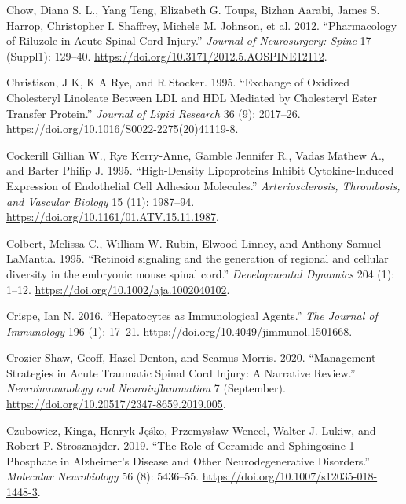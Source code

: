 \documentclass[9pt,lineno]{elife}
\newlength{\cslhangindent}
\newlength{\cslentryspacingunit} %
\newenvironment{CSLReferences}[2] %
 {%
  \setlength{\parindent}{0pt}
  \ifodd #1
  \let\oldpar\par
  \def\par{\hangindent=\cslhangindent\oldpar}
  \fi
  \setlength{\parskip}{#2\cslentryspacingunit}
 }%
 {}
\begin{document}
\begin{landscape}
\begin{landscape}
\begin{landscape}
\begin{landscape}
\begin{CSLReferences}{1}{0}
\leavevmode{}%
Chow, Diana S. L., Yang Teng, Elizabeth G. Toups, Bizhan Aarabi, James S. Harrop, Christopher I. Shaffrey, Michele M. Johnson, et al. 2012. {``Pharmacology of Riluzole in Acute Spinal Cord Injury.''} \emph{Journal of Neurosurgery: Spine} 17 (Suppl1): 129--40. \url{https://doi.org/10.3171/2012.5.AOSPINE12112}.

\leavevmode{}%
Christison, J K, K A Rye, and R Stocker. 1995. {``Exchange of Oxidized Cholesteryl Linoleate Between {LDL} and {HDL} Mediated by Cholesteryl Ester Transfer Protein.''} \emph{Journal of Lipid Research} 36 (9): 2017--26. \url{https://doi.org/10.1016/S0022-2275(20)41119-8}.

\leavevmode{}%
Cockerill Gillian W., Rye Kerry-Anne, Gamble Jennifer R., Vadas Mathew A., and Barter Philip J. 1995. {``High-{Density Lipoproteins Inhibit Cytokine-Induced Expression} of {Endothelial Cell Adhesion Molecules}.''} \emph{Arteriosclerosis, Thrombosis, and Vascular Biology} 15 (11): 1987--94. \url{https://doi.org/10.1161/01.ATV.15.11.1987}.

\leavevmode{}%
Colbert, Melissa C., William W. Rubin, Elwood Linney, and Anthony-Samuel LaMantia. 1995. {``{Retinoid signaling and the generation of regional and cellular diversity in the embryonic mouse spinal cord}.''} \emph{Developmental Dynamics} 204 (1): 1--12. \url{https://doi.org/10.1002/aja.1002040102}.

\leavevmode{}%
Crispe, Ian N. 2016. {``Hepatocytes as {Immunological Agents}.''} \emph{The Journal of Immunology} 196 (1): 17--21. \url{https://doi.org/10.4049/jimmunol.1501668}.

\leavevmode{}%
Crozier-Shaw, Geoff, Hazel Denton, and Seamus Morris. 2020. {``Management Strategies in Acute Traumatic Spinal Cord Injury: A Narrative Review.''} \emph{Neuroimmunology and Neuroinflammation} 7 (September). \url{https://doi.org/10.20517/2347-8659.2019.005}.

\leavevmode{}%
Czubowicz, Kinga, Henryk Jęśko, Przemysław Wencel, Walter J. Lukiw, and Robert P. Strosznajder. 2019. {``The {Role} of {Ceramide} and {Sphingosine-1-Phosphate} in {Alzheimer}'s {Disease} and {Other Neurodegenerative Disorders}.''} \emph{Molecular Neurobiology} 56 (8): 5436--55. \url{https://doi.org/10.1007/s12035-018-1448-3}.


\end{CSLReferences}
\end{landscape}
\end{landscape}
\end{landscape}
\end{landscape}
\end{document}
